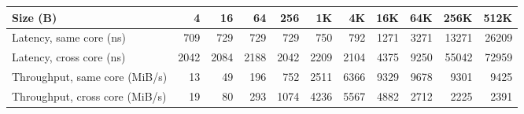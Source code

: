 \begin{tabular}{lrrrrrrrrrr}
\toprule
Size (B) & 4 & 16 & 64 & 256 & 1K & 4K & 16K & 64K & 256K & 512K \\
\midrule
Latency, same core (ns) & 709 & 729 & 729 & 729 & 750 & 792 & 1271 & 3271 & 13271 & 26209 \\
Latency, cross core (ns) & 2042 & 2084 & 2188 & 2042 & 2209 & 2104 & 4375 & 9250 & 55042 & 72959 \\
Throughput, same core (MiB/s) & 13 & 49 & 196 & 752 & 2511 & 6366 & 9329 & 9678 & 9301 & 9425 \\
Throughput, cross core (MiB/s) & 19 & 80 & 293 & 1074 & 4236 & 5567 & 4882 & 2712 & 2225 & 2391 \\
\bottomrule
\end{tabular}
